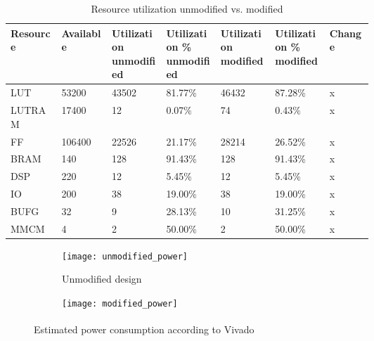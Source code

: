 \documentclass[../bachelor_paper.tex]{subfiles}
\begin{document}
\begin{table}
    \centering
    \begin{tabular}{llp{0.15\linewidth}p{0.15\linewidth}p{0.15\linewidth}p{0.15\linewidth}l}
    \textbf{Resource}   & \textbf{Available}    & \textbf{Utilization unmodified} & \textbf{Utilization \% unmodified}  & \textbf{Utilization modified}   & \textbf{Utilization \% modified}    & \textbf{Change}\\
    \hline
    \acs{LUT}           & 53200                 & 43502                     & 81.77\%                       & 46432                     & 87.28\%   & x\\
    \acs{LUTRAM}        & 17400                 & 12                        & 0.07\%                        & 74                        & 0.43\%    & x\\
    \acs{FF}            & 106400                & 22526                     & 21.17\%                       & 28214                     & 26.52\%   & x\\
    \acs{BRAM}          & 140                   & 128                       & 91.43\%                       & 128                       & 91.43\%   & x\\
    \acs{DSP}           & 220                   & 12                        & 5.45\%                        & 12                        & 5.45\%    & x\\
    \acs{IO}            & 200                   & 38                        & 19.00\%                       & 38                        & 19.00\%   & x\\
    \acs{BUFG}          & 32                    & 9                         & 28.13\%                       & 10                        & 31.25\%   & x\\
    \acs{MMCM}          & 4                     & 2                         & 50.00\%                       & 2                         & 50.00\%   & x\\
    \hline
    \end{tabular}
    \caption{Resource utilization unmodified vs. modified}
    \label{tab:perf/util/data}
\end{table}

\begin{figure}
    \centering
    \begin{subfigure}{0.45\textwidth}
        \texttt{[image: unmodified\_power]}
        \caption{Unmodified design}
        \label{fig:perf/power/split/unmod}
    \end{subfigure}
    \hfil
    \begin{subfigure}{0.45\textwidth}
        \texttt{[image: modified\_power]}
        \label{fig:perf/power/split/mod}
    \end{subfigure}
    \caption{Estimated power consumption according to Vivado\textsuperscript{\textregistered}}
    \label{fig:perf/power/split}
\end{figure}

\isstandalone



\fi
\end{document}
